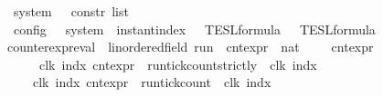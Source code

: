 \begin{isabellebody}
\isanewline
{}\isamarkupfalse%
\ {\isacharprime}{\isasymtau}\ system\ {\isacharequal}\ {\isacartoucheopen}{\isacharprime}{\isasymtau}\ constr\ list{\isacartoucheclose}\isanewline
\isanewline
\isanewline
%
\isanewline
{}\isamarkupfalse%
\ {\isacharprime}{\isasymtau}\ config\ {\isacharequal}\ {\isacartoucheopen}{\isacharprime}{\isasymtau}\ system\ {\isacharasterisk}\ instant{\isacharunderscore}index\ {\isacharasterisk}\ {\isacharprime}{\isasymtau}\ TESL{\isacharunderscore}formula\ {\isacharasterisk}\ {\isacharprime}{\isasymtau}\ TESL{\isacharunderscore}formula{\isacartoucheclose}%
\isadelimdocument
%
\endisadelimdocument
%
\isatagdocument
%
\isamarkuptrue%
%
\endisatagdocument
{\isafolddocument}%
%
\isadelimdocument
%
\endisadelimdocument
{}\isamarkupfalse%
\ counter{\isacharunderscore}expr{\isacharunderscore}eval\ {\isacharcolon}{\isacharcolon}\ {\isacartoucheopen}{\isacharparenleft}{\isacharprime}{\isasymtau}{\isacharcolon}{\isacharcolon}linordered{\isacharunderscore}field{\isacharparenright}\ run\ {\isasymRightarrow}\ cnt{\isacharunderscore}expr\ {\isasymRightarrow}\ nat{\isacartoucheclose}\ {\isacharparenleft}{\isachardoublequoteopen}{\isasymlbrakk}\ {\isacharunderscore}\ {\isasymturnstile}\ {\isacharunderscore}\ {\isasymrbrakk}\isactrlsub c\isactrlsub n\isactrlsub t\isactrlsub e\isactrlsub x\isactrlsub p\isactrlsub r{\isachardoublequoteclose}{\isacharparenright}\isanewline
{}\isanewline
\ \ {\isacartoucheopen}{\isasymlbrakk}\ {\isasymrho}\ {\isasymturnstile}\ {\isacharhash}\isactrlsup {\isacharless}\ clk\ indx\ {\isasymrbrakk}\isactrlsub c\isactrlsub n\isactrlsub t\isactrlsub e\isactrlsub x\isactrlsub p\isactrlsub r\ {\isacharequal}\ run{\isacharunderscore}tick{\isacharunderscore}count{\isacharunderscore}strictly\ {\isasymrho}\ clk\ indx{\isacartoucheclose}\isanewline
{\isacharbar}\ {\isacartoucheopen}{\isasymlbrakk}\ {\isasymrho}\ {\isasymturnstile}\ {\isacharhash}\isactrlsup {\isasymle}\ clk\ indx\ {\isasymrbrakk}\isactrlsub c\isactrlsub n\isactrlsub t\isactrlsub e\isactrlsub x\isactrlsub p\isactrlsub r\ {\isacharequal}\ run{\isacharunderscore}tick{\isacharunderscore}count\ {\isasymrho}\ clk\ indx{\isacartoucheclose}\isanewline

\end{isabellebody}
